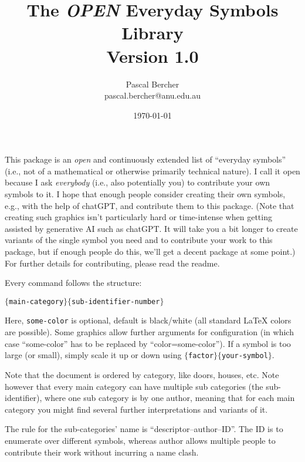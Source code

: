 \documentclass{article}
\begin{document}
\title{The \emph{OPEN} Everyday Symbols Library\\[1ex]\large Version 1.0}
\author{Pascal Bercher\\pascal.bercher@anu.edu.au}
\date{\today}

\maketitle

\setlength{\parindent}{0pt}

This package is an \emph{open} and continuously extended list of ``everyday symbols'' (i.e., not of a mathematical or otherwise primarily technical nature). I call it open because I ask \emph{everybody} (i.e., also potentially you) to contribute your own symbols to it. I hope that enough people consider creating their own symbols, e.g., with the help of chatGPT, and contribute them to this package. (Note that creating such graphics isn't particularly hard or time-intense when getting assisted by generative AI such as chatGPT. It will take you a bit longer to create variants of the single symbol you need and to contribute your work to this package, but if enough people do this, we'll get a decent package at some point.) For further details for contributing, please read the readme.

\medskip
Every command follows the structure:
\begin{center}
  \texttt{\string{}$\{$main-category$\}\{$sub-identifier-number$\}$}
\end{center}
Here, \texttt{some-color} is optional, default is black/white (all standard \LaTeX{} colors are possible). Some graphics allow further arguments for configuration (in which case ``some-color'' has to be replaced by ``color=some-color''). If a symbol is too large (or small), simply scale it up or down using
\texttt{\string\scalebox$\{$factor$\}\{$your-symbol$\}$}.

\medskip
Note that the document is ordered by category, like doors, houses, etc. Note however that every main category can have multiple sub categories (the sub-identifier), where one sub category is by one author, meaning that for each main category you might find several further interpretations and variants of it. 

\medskip
The rule for the sub-categories' name is ``descriptor--author--ID''. The ID is to enumerate over different symbols, whereas author allows multiple people to contribute their work without incurring a name clash.
\end{document}
